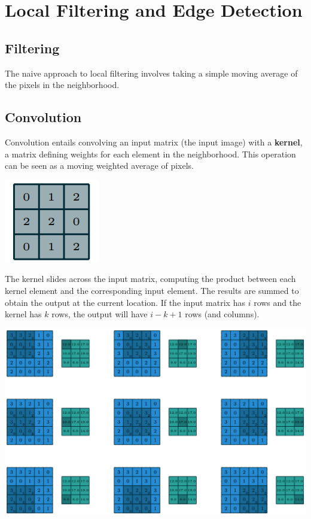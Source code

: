
\section{Local Filtering and Edge Detection}

\subsection{Filtering}
The naive approach to local filtering involves taking a simple moving average of the pixels in the neighborhood.

\subsection{Convolution}
Convolution entails convolving an input matrix (the input image) with a \textbf{kernel},
a matrix defining weights for each element in the neighborhood.
This operation can be seen as a moving weighted average of pixels.
\begin{center}
    \includegraphics[width=0.4\linewidth]{img/Kernel_Convolution}
\end{center}
The kernel slides across the input matrix, computing the product between each kernel element and the corresponding input element.
The results are summed to obtain the output at the current location.
If the input matrix has $i$ rows and the kernel has $k$ rows, the output will have $i-k+1$ rows (and columns).

\begin{center}
    \includegraphics[width=0.8\linewidth]{img/ConvolutionOutput}
\end{center}

